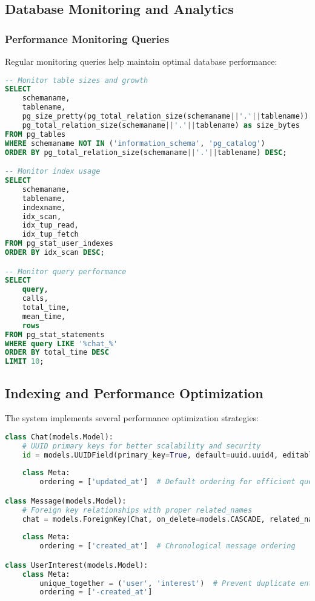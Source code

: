 \documentclass[12pt,a4paper]{article}
\begin{document}
\subsection{Database Monitoring and Analytics}

\subsubsection{Performance Monitoring Queries}

Regular monitoring queries help maintain optimal database performance:

\begin{lstlisting}[language=SQL, caption=Database Performance Monitoring]
-- Monitor table sizes and growth
SELECT 
    schemaname,
    tablename,
    pg_size_pretty(pg_total_relation_size(schemaname||'.'||tablename)) as size,
    pg_total_relation_size(schemaname||'.'||tablename) as size_bytes
FROM pg_tables 
WHERE schemaname NOT IN ('information_schema', 'pg_catalog')
ORDER BY pg_total_relation_size(schemaname||'.'||tablename) DESC;

-- Monitor index usage
SELECT 
    schemaname,
    tablename,
    indexname,
    idx_scan,
    idx_tup_read,
    idx_tup_fetch
FROM pg_stat_user_indexes
ORDER BY idx_scan DESC;

-- Monitor query performance
SELECT 
    query,
    calls,
    total_time,
    mean_time,
    rows
FROM pg_stat_statements
WHERE query LIKE '%chat_%'
ORDER BY total_time DESC
LIMIT 10;
\end{lstlisting}

\subsection{Indexing and Performance Optimization}

The system implements several performance optimization strategies:

\begin{lstlisting}[language=Python, caption=Model Optimization Examples]
class Chat(models.Model):
    # UUID primary keys for better scalability and security
    id = models.UUIDField(primary_key=True, default=uuid.uuid4, editable=False)
    
    class Meta:
        ordering = ['updated_at']  # Default ordering for efficient queries

class Message(models.Model):
    # Foreign key relationships with proper related_names
    chat = models.ForeignKey(Chat, on_delete=models.CASCADE, related_name='messages')
    
    class Meta:
        ordering = ['created_at']  # Chronological message ordering

class UserInterest(models.Model):
    class Meta:
        unique_together = ('user', 'interest')  # Prevent duplicate entries
        ordering = ['-created_at']
\end{lstlisting}
\end{document}

